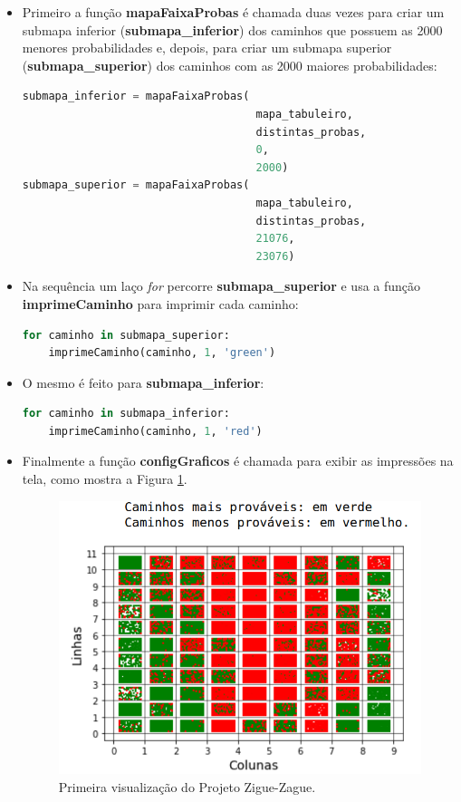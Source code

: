 \documentclass[12pt]{article}
\begin{document}
\begin{itemize}
	\item Primeiro a função \textbf{mapaFaixaProbas} é chamada duas vezes para criar um submapa inferior (\textbf{submapa\_inferior}) dos caminhos que possuem as 2000 menores probabilidades e, depois, para criar um submapa superior (\textbf{submapa\_superior}) dos caminhos com as 2000 maiores probabilidades:
	
\begin{lstlisting}[language=Python]
submapa_inferior = mapaFaixaProbas(
									mapa_tabuleiro, 
									distintas_probas, 
									0, 
									2000)
submapa_superior = mapaFaixaProbas(
									mapa_tabuleiro, 
									distintas_probas, 
									21076, 
									23076)
\end{lstlisting}
	\item Na sequência um laço \textit{for} percorre \textbf{submapa\_superior} e usa a função \textbf{imprimeCaminho} para imprimir cada caminho:
\begin{lstlisting}[language=Python]
for caminho in submapa_superior:
	imprimeCaminho(caminho, 1, 'green')
\end{lstlisting} 
	\item O mesmo é feito para \textbf{submapa\_inferior}:
\begin{lstlisting}[language=Python]
for caminho in submapa_inferior:
	imprimeCaminho(caminho, 1, 'red')
\end{lstlisting}
	\item Finalmente a função \textbf{configGraficos} é chamada para exibir as impressões na tela, como mostra a Figura \ref{primeira_visualizacao}.
	
	\begin{figure}[ht!]
		\centering
		\includegraphics[width=0.7\linewidth]{img/primeira_visualizacao.png}
		\caption{Primeira visualização do Projeto Zigue-Zague.}	
		\label{primeira_visualizacao}
	\end{figure}
\end{itemize}
\end{document}
